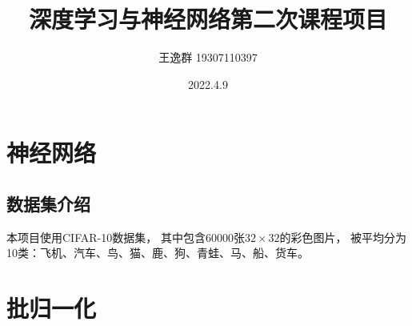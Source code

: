 \documentclass{article}
\title{深度学习与神经网络第二次课程项目}
\author{王逸群 19307110397}
\date{2022.4.9}
\begin{document}
	
\maketitle

\section{神经网络}

\subsection{数据集介绍}

本项目使用CIFAR-10数据集，
其中包含60000张$32\times32$的彩色图片，
被平均分为10类：飞机、汽车、鸟、猫、鹿、狗、青蛙、马、船、货车。

\section{批归一化}
	
\end{document}
